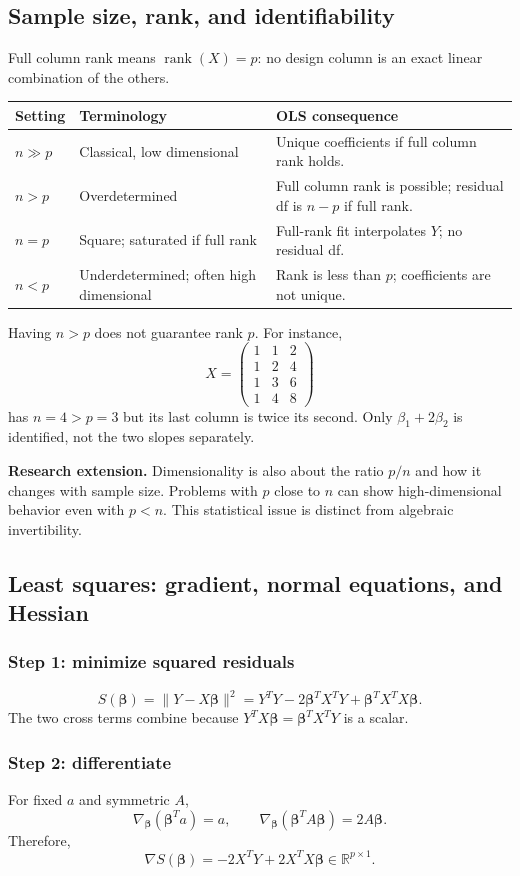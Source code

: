 \documentclass[11pt]{article}
\newcommand{\R}{\mathbb R}\newcommand{\one}{\mathbf 1}\newcommand{\be}{\boldsymbol\beta}\newcommand{\eps}{\boldsymbol\varepsilon}
\begin{document}
\subsection{Sample size, rank, and identifiability}
Full column rank means $\operatorname{rank}(X)=p$: no design column is an exact linear combination of the others.
\begin{center}\small
\begin{tabular}{p{.14\linewidth}p{.28\linewidth}p{.48\linewidth}}\toprule
Setting&Terminology&OLS consequence\\\midrule
$n\gg p$&Classical, low dimensional&Unique coefficients if full column rank holds.\\
$n>p$&Overdetermined&Full column rank is possible; residual df is $n-p$ if full rank.\\
$n=p$&Square; saturated if full rank&Full-rank fit interpolates $Y$; no residual df.\\
$n<p$&Underdetermined; often high dimensional&Rank is less than $p$; coefficients are not unique.\\\bottomrule
\end{tabular}\end{center}
Having $n>p$ does not guarantee rank $p$. For instance,
\[
X=\begin{pmatrix}1&1&2\\1&2&4\\1&3&6\\1&4&8\end{pmatrix}
\]
has $n=4>p=3$ but its last column is twice its second. Only $\beta_1+2\beta_2$ is identified, not the two slopes separately.

\textbf{Research extension.} Dimensionality is also about the ratio $p/n$ and how it changes with sample size. Problems with $p$ close to $n$ can show high-dimensional behavior even with $p<n$. This statistical issue is distinct from algebraic invertibility.

\subsection{Least squares: gradient, normal equations, and Hessian}
\subsubsection*{Step 1: minimize squared residuals}
\[
S(\be)=\|Y-X\be\|^2
=Y^TY-2\be^TX^TY+\be^TX^TX\be.
\]
The two cross terms combine because $Y^TX\be=\be^TX^TY$ is a scalar.
\subsubsection*{Step 2: differentiate}
For fixed $a$ and symmetric $A$,
\[
\nabla_{\be}(\be^Ta)=a,\qquad
\nabla_{\be}(\be^TA\be)=2A\be.
\]
Therefore,
\[
\nabla S(\be)=-2X^TY+2X^TX\be\in\R^{p\times1}.
\]
\end{document}
